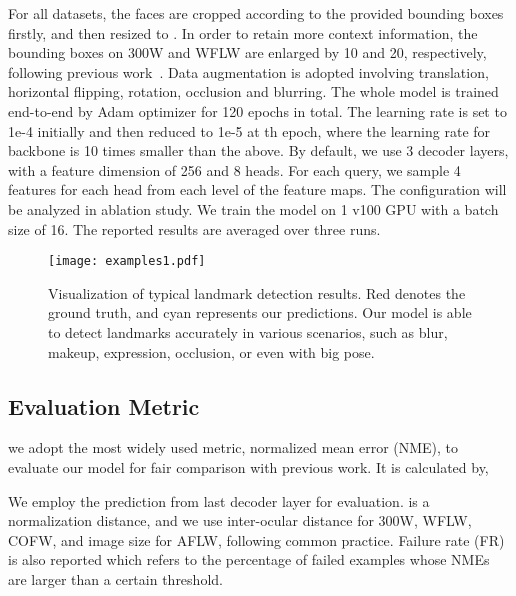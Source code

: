 For all datasets, the faces are cropped according to the provided bounding boxes firstly, and then resized to . In order to retain more context information, the bounding boxes on 300W and WFLW are enlarged by 10 and 20, respectively, following previous work~\cite{PIPNet2021}.
Data augmentation is adopted involving translation, horizontal flipping, rotation, occlusion and blurring.
The whole model is trained end-to-end by Adam optimizer for 120 epochs in total. The learning rate is set to 1e-4 initially and then reduced to 1e-5 at th epoch, where the learning rate for backbone is 10 times smaller than the above. By default, we use 3 decoder layers, with a feature dimension of 256 and
8 heads. For each query, we sample 4 features for each head from each level of the feature maps. The configuration will be analyzed in ablation study. We train the model on 1 v100 GPU with a batch size of 16. The reported results are averaged over three runs.

\begin{figure*}[t]
    \centering
        \texttt{[image: examples1.pdf]}
        \vspace{-2mm}
    \caption{Visualization of typical landmark detection results.
\textcolor[rgb]{1,0,0}{Red} denotes the ground truth, and \textcolor[rgb]{0,1,1}{cyan} represents our predictions. Our model is able to detect landmarks accurately in various scenarios, such as blur, makeup, expression, occlusion, or even with big pose.}
\label{example}
\end{figure*}

\subsection{Evaluation Metric}

we adopt the most widely used metric, normalized mean error (NME), to evaluate our model for fair comparison with
previous work. It is calculated by,
\vspace{-1mm}


We employ the prediction from last decoder layer for evaluation.  is a normalization distance, and we use inter-ocular
distance for 300W, WFLW, COFW, and image size for AFLW, following common practice.
Failure rate (FR) is also reported which refers to the percentage of failed examples whose NMEs are larger than a certain threshold.

